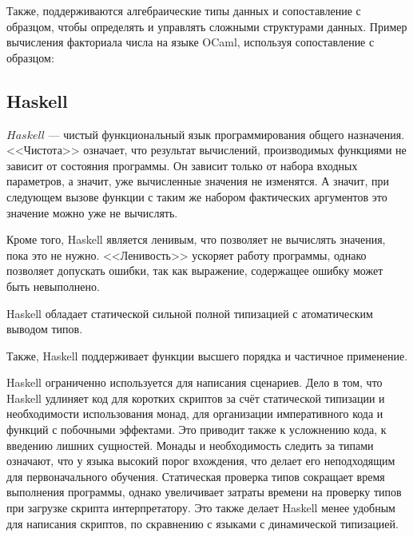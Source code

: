         Также, поддерживаются алгебраические типы данных и сопоставление с образцом, чтобы определять и управлять сложными структурами данных\cite{ocaml}.
        Пример вычисления факториала числа на языке OCaml, используя сопоставление с образцом:

        

    \subsection{Haskell}
        $Haskell$ --- чистый функциональный язык программирования общего назначения.
        <<Чистота>> означает, что результат вычислений, производимых функциями не зависит от состояния программы.
        Он зависит только от набора входных параметров, а значит, уже вычисленные значения не изменятся.
        А значит, при следующем вызове функции с таким же набором фактических аргументов это значение можно уже не вычислять.

        Кроме того, Haskell является ленивым, что позволяет не вычислять значения, пока это не нужно.
        <<Ленивость>> ускоряет работу программы, однако позволяет допускать ошибки, так как выражение, содержащее ошибку может быть невыполнено.

        Haskell обладает статической сильной полной типизацией с атоматическим выводом типов.
        
        Также, Haskell поддерживает функции высшего порядка и частичное применение.

        Haskell ограниченно используется для написания сценариев.
        Дело в том, что Haskell удлиняет код для коротких скриптов за счёт статической типизации и необходимости использования монад, для организации императивного кода и функций с побочными эффектами.
        Это приводит также к усложнению кода, к введению лишних сущностей.
        Монады и необходимость следить за типами означают, что у языка высокий порог вхождения, что делает его неподходящим для первоначального обучения.
        Статическая проверка типов сокращает время выполнения программы, однако увеличивает затраты времени на проверку типов при загрузке скрипта интерпретатору.
        Это также делает Haskell менее удобным для написания скриптов, по скравнению с языками с динамической типизацией.

